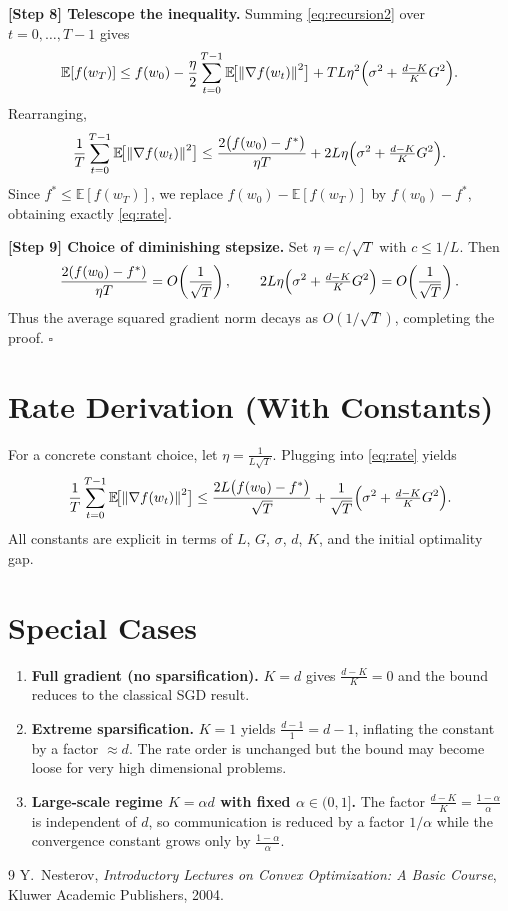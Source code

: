 \documentclass{article}
\newcommand{\E}{\mathbb{E}}
\newcommand{\norm}[1]{\left\|#1\right\|}
\begin{document}
\noindent\textbf{[Step 8] Telescope the inequality.}
Summing \eqref{eq:recursion2} over $t=0,\dots,T-1$ gives
\[
\E[f(w_{T})]\le f(w_{0})
-\frac{\eta}{2}\sum_{t=0}^{T-1}\E\!\bigl[\norm{\nabla f(w_{t})}^{2}\bigr]
+TL\eta^{2}\Bigl(\sigma^{2}+ \tfrac{d-K}{K}G^{2}\Bigr).
\]
Rearranging,
\[
\frac{1}{T}\sum_{t=0}^{T-1}\E\!\bigl[\norm{\nabla f(w_{t})}^{2}\bigr]
\le
\frac{2\bigl(f(w_{0})-f^{*}\bigr)}{\eta T}
+2L\eta\Bigl(\sigma^{2}+ \tfrac{d-K}{K}G^{2}\Bigr).
\]
Since $f^{*}\le \E[f(w_{T})]$, we replace $f(w_{0})- \E[f(w_{T})]$ by $f(w_{0})-f^{*}$, obtaining exactly \eqref{eq:rate}.

\noindent\textbf{[Step 9] Choice of diminishing stepsize.}
Set $\eta=c/\sqrt{T}$ with $c\le 1/L$. Then
\[
\frac{2(f(w_{0})-f^{*})}{\eta T}=O\!\left(\frac{1}{\sqrt{T}}\right),\qquad
2L\eta\Bigl(\sigma^{2}+ \tfrac{d-K}{K}G^{2}\Bigr)=O\!\left(\frac{1}{\sqrt{T}}\right).
\]
Thus the average squared gradient norm decays as $O(1/\sqrt{T})$, completing the proof. \hfill $\square$

\section*{Rate Derivation (With Constants)}
For a concrete constant choice, let $\eta = \frac{1}{L\sqrt{T}}$.
Plugging into \eqref{eq:rate} yields
\[
\frac{1}{T}\sum_{t=0}^{T-1}\E\!\bigl[\norm{\nabla f(w_{t})}^{2}\bigr]
\le
\frac{2L\bigl(f(w_{0})-f^{*}\bigr)}{\sqrt{T}}
+\frac{1}{\sqrt{T}}\Bigl(\sigma^{2}+ \tfrac{d-K}{K}G^{2}\Bigr).
\]
All constants are explicit in terms of $L$, $G$, $\sigma$, $d$, $K$, and the initial optimality gap.

\section*{Special Cases}
\begin{enumerate}
\item \textbf{Full gradient (no sparsification).} $K=d$ gives $\frac{d-K}{K}=0$ and the bound reduces to the classical SGD result.
\item \textbf{Extreme sparsification.} $K=1$ yields $\frac{d-1}{1}=d-1$, inflating the constant by a factor $\approx d$. The rate order is unchanged but the bound may become loose for very high dimensional problems.
\item \textbf{Large‑scale regime $K=\alpha d$ with fixed $\alpha\in(0,1]$.} The factor $\frac{d-K}{K}= \frac{1-\alpha}{\alpha}$ is independent of $d$, so communication is reduced by a factor $1/\alpha$ while the convergence constant grows only by $\frac{1-\alpha}{\alpha}$.
\end{enumerate}

\begin{thebibliography}{9}
Y.~Nesterov, \emph{Introductory Lectures on Convex Optimization: A Basic Course}, Kluwer Academic Publishers, 2004.
\end{thebibliography}
\end{document}
